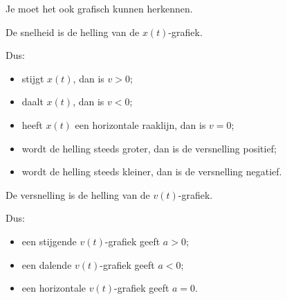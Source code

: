 \documentclass{ximera}
\begin{document}
Je moet het ook grafisch kunnen herkennen.


De snelheid is de helling van de $x(t)$-grafiek.

Dus:

\begin{itemize}

 \item stijgt $x(t)$, dan is $v>0$;

 \item daalt $x(t)$, dan is $v<0$;

 \item heeft $x(t)$ een horizontale raaklijn, dan is $v=0$;

 \item wordt de helling steeds groter, dan is de versnelling positief;

 \item wordt de helling steeds kleiner, dan is de versnelling negatief.

\end{itemize}


De versnelling is de helling van de $v(t)$-grafiek.

Dus:

\begin{itemize}

 \item een stijgende $v(t)$-grafiek geeft $a>0$;

 \item een dalende $v(t)$-grafiek geeft $a<0$;

 \item een horizontale $v(t)$-grafiek geeft $a=0$.

\end{itemize}
\end{document}
